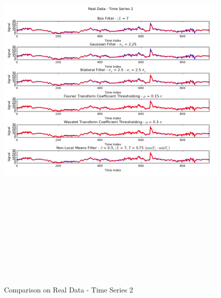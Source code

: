 \documentclass[11pt]{article}
\theoremstyle{definition}
\begin{document}
\begin{figure}[h!]
\centering
\includegraphics[width = 0.95 \textwidth,height = 8in]{TimeSeries2RealCompare.png}
\caption{Comparison on Real Data - Time Series 2}
\label{timeseries2realcompare}
\end{figure}
\end{document}
